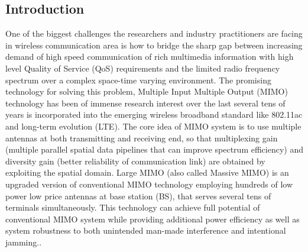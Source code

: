 \documentclass[12pt, draftclsnofoot, onecolumn]{IEEEtran}
\begin{document}
\begin{spacing}{2}
\section{Introduction}
% 
% 
% 
% 

 
  One of the biggest challenges the researchers and industry practitioners are facing in wireless communication area is how to bridge the sharp gap between increasing demand of high speed communication of rich multimedia information with high level Quality of Service (QoS) requirements and the limited radio frequency spectrum over a complex space-time varying environment. The promising technology for solving this problem, Multiple Input Multiple Output (MIMO) technology has been of immense research interest over the last several tens of years is incorporated into the emerging wireless broadband standard like 802.11ac\cite{IEEE802.11ac} and long-term evolution (LTE)\cite{3GLTE}.  The core idea of MIMO system is to use multiple antennas at both transmitting and receiving end, so that multiplexing gain (multiple parallel spatial data pipelines that can improve spectrum efficiency) and diversity gain (better reliability of communication link) are obtained by exploiting the spatial domain. Large MIMO (also called Massive MIMO) is an upgraded version of conventional MIMO technology employing hundreds of low power low price antennas at base station (BS), that serves several tens of terminals simultaneously. This technology can achieve full potential of conventional MIMO system while providing additional power efficiency as well as system robustness to both unintended man-made interference and intentional jamming.\cite{rusek2013scaling}\cite{larsson2014massive}. 
    

\end{spacing}
\end{document}
